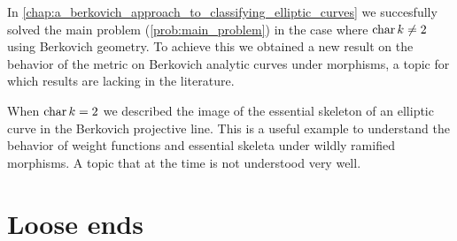 In \cref{chap:a_berkovich_approach_to_classifying_elliptic_curves} we succesfully solved the main problem (\cref{prob:main_problem}) in the case where $\operatorname{char} k \ne 2$ using Berkovich geometry. 
To achieve this we obtained a new result on the behavior of the metric on Berkovich analytic curves under morphisms, a topic for which results are lacking in the literature. 

When $\operatorname{char} k = 2$ we described the image of the essential skeleton of an elliptic curve in the Berkovich projective line. 
This is a useful example to understand the behavior of weight functions and essential skeleta under wildly ramified morphisms. 
A topic that at the time is not understood very well. 

\section{Loose ends} \label{sec:loose_ends}




